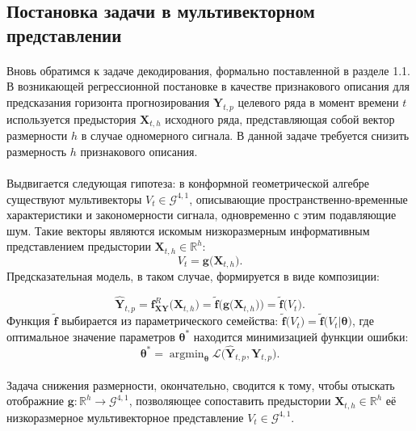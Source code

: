 \documentclass[12pt]{article}
\newcommand\argmin{\mathop{\arg\min}}
\begin{document}
\newpage
\subsection{Постановка задачи в мультивекторном представлении}\label{statement}
\paragraph{}
Вновь обратимся к задаче декодирования, формально поставленной в разделе 1.1. В возникающей регрессионной постановке в качестве признакового описания для предсказания горизонта прогнозирования $\textbf{Y}_{t,p}$ целевого ряда в момент времени $t$ используется предыстория $\textbf{X}_{t,h}$ исходного ряда, представляющая собой вектор размерности $h$ в случае одномерного сигнала. В данной задаче требуется снизить размерность $h$ признакового описания.
\paragraph{}
Выдвигается следующая гипотеза: в конформной геометрической алгебре существуют мультивекторы $V_t \in \mathcal{G}^{4,1}$, описывающие пространственно-временные характеристики и закономерности сигнала, одновременно с этим подавляющие шум. Такие векторы являются искомым низкоразмерным информативным представлением предыстории $\textbf{X}_{t,h} \in \mathds{R}^h$:
$$ V_t = \textbf{g}\Big(\textbf{X}_{t,h} \Big). $$
Предсказательная модель, в таком случае, формируется в виде композиции:

$$ \hat{\textbf{Y}}_{t,p} = \textbf{f}^{R}_{\textbf{XY}}\Big( \textbf{X}_{t,h} \Big) = \tilde{\textbf{f}}\Big(\textbf{g}\Big(\textbf{X}_{t,h} \Big) \Big) = \tilde{\textbf{f}}\Big( V_t  \Big).
$$
\noindent
Функция $\tilde{\textbf{f}}$ выбирается из 
параметрического семейства: $\tilde{\textbf{f}}\big( V_t  \big) = \tilde{\textbf{f}}\big( V_t | \boldsymbol{\theta} \big)$, где оптимальное значение параметров $\boldsymbol{\theta}^*$ находится минимизацией функции ошибки:
$$ \boldsymbol{\theta}^* = \argmin_{\boldsymbol{\theta}}\mathcal{L}\Big(\hat{\textbf{Y}}_{t,p}, \textbf{Y}_{t,p}  \Big).$$

\paragraph{}
Задача снижения размерности, окончательно, сводится к тому, чтобы отыскать отображние $\mathbf{g}: \mathds{R}^h \rightarrow \mathcal{G}^{4,1}$, позволяющее сопоставить предыстории $\textbf{X}_{t,h} \in \mathds{R}^h$ её низкоразмерное мультивекторное представление $V_t \in \mathcal{G}^{4,1}$.
\end{document}
